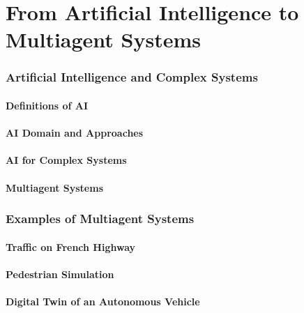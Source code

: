 \localized
\localized

\part{From Artificial Intelligence to Multiagent Systems}
\begin{bibliographysection}

	\section{Artificial Intelligence and Complex Systems}
	\subsection{Definitions of AI}
	\localized
	\localized
	\subsection{AI Domain and Approaches}
	\localized
	\localized
	\subsection{AI for Complex Systems}
	\localized
	\subsection{Multiagent Systems}
	\localized

	\section[MABS Examples]{Examples of Multiagent Systems}
	\subsection{Traffic on French Highway}
	\localized
	\subsection{Pedestrian Simulation}
	\localized
	\subsection{Digital Twin of an Autonomous Vehicle}
	\localized

	\thanksslide
\end{bibliographysection}

